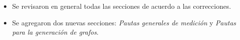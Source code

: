 \begin{itemize}
    \item Se revisaron en general todas las secciones de acuerdo a las correcciones.
    \item Se agregaron dos nuevas secciones: \textit{Pautas generales de medición} y \textit{Pautas para la generación de grafos}.
\end{itemize}

